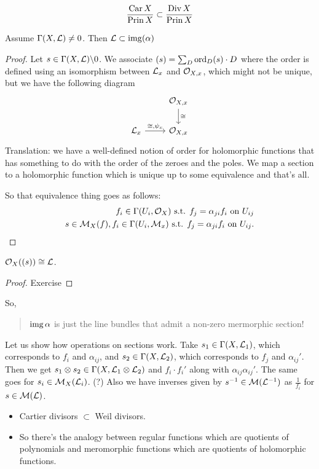\[\dfrac{\operatorname{Car} X}{\operatorname{Prin} X}\subset\dfrac{\operatorname{Div} X}{\operatorname{Prin} X}\]
\begin{claim}
	Assume $\Gamma(X,\mathcal{L})\neq0$. Then $\mathcal{L}\subset\operatorname{img}(\alpha)$
\end{claim}
\begin{proof}
	Let $s\in\Gamma(X,\mathcal{L})\backslash0$. We associate $(s)=\sum_D\operatorname{ord}_D(s)\cdot D$ where the order is defined using an isomorphism between $\mathcal{L}_x$ and $\mathcal{O}_{X,x}$, which might not be unique, but we have the following diagram
	\[\begin{tikzcd}
		&\Oc_{X,x}\arrow[d,"\cong"]\\
		\Lc_x\arrow[r,"\cong\text{,}\psi_x"]&\Oc_{X,x}
	\end{tikzcd}\]
	Translation: we have a well-defined notion of order for holomorphic functions that has something to do with the order of the zeroes and the poles. We map a section to a holomorphic function which is unique up to some equivalence and that's all.
	
	So that equivalence thing goes as follows:
	\begin{align*}
		f_i\in\Gamma(U_i,\mathcal{O}_X) \text{ s.t. } f_j=\alpha_{ji}f_i\text{ on }U_{ij}\\
		s\in\mathcal{M}_X(f),f_i\in\Gamma(U_i,\mathcal{M}_x)\text{ s.t. }f_j=\alpha_{ji}f_i\text{ on }U_{ij}.
	\end{align*}
\end{proof}
\begin{claim}
	$\mathcal{O}_X((s))\cong\mathcal{L}$.
\end{claim}
\begin{proof}
	Exercise
\end{proof}
So,
\begin{quote}
	{\color{red}$\operatorname{img}\alpha$ is just the line bundles that admit a non-zero mermorphic section!}
\end{quote}
Let us show how operations on sections work. Take $s_1\in\Gamma(X,\mathcal{L}_1)$, which corresponds to $f_i$ and $\alpha_{ij}$, and $s_2\in\Gamma(X,\mathcal{L}_2)$, which corresponds to $f_j$ and $\alpha_{ij}'$. Then we get $s_1\otimes s_2\in\Gamma(X,\mathcal{L}_1\otimes\mathcal{L}_2)$ and $f_i\cdot f_i'$ along with $\alpha_{ij}\alpha_{ij}'$. {\color{magenta}The same goes for $s_i\in\mathcal{M}_X(\mathcal{L}_i)$. (?)} Also we have inverses given by $s^{-1}\in\mathcal{M}(\mathcal{L}^{-1})$ as $\frac{1}{f_i}$ for $s\in\mathcal{M}(\mathcal{L})$.
\begin{remark}\leavevmode
	\begin{itemize}
		\item Cartier divisors $\subset$ Weil divisors.
		\item So there's the analogy between regular functions which are quotients of polynomials and meromorphic functions which are quotients of holomorphic functions.
	\end{itemize}
\end{remark}
